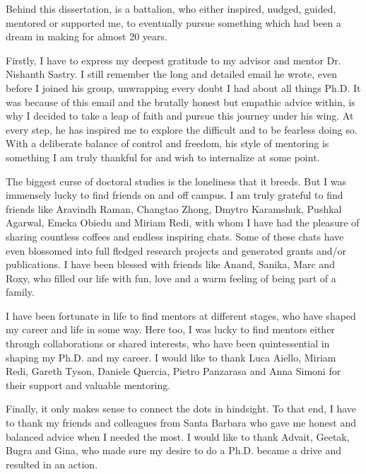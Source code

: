 
\begin{acknowledgements}      

Behind this dissertation, is a battalion, who either inspired, nudged, guided, mentored or supported me, to eventually pursue something which had been a dream in making for almost 20 years. 

Firstly, I have to express my deepest gratitude to my advisor and mentor Dr. Nishanth Sastry. I still remember the long and detailed email he wrote, even before I joined his group, unwrapping every doubt I had about all things Ph.D. It was because of this email and the brutally honest but empathic advice within, is why I decided to take a leap of faith and pursue this journey under his wing.  At every step, he has inspired me to explore the difficult and to be fearless doing so. With a deliberate balance of control and freedom, his style of mentoring is something I am truly thankful for and wish to internalize at some point.

The biggest curse of doctoral studies is the loneliness that it breeds. But I was immensely lucky to find friends on and off campus. I am truly grateful to find friends like Aravindh Raman, Changtao Zhong, Dmytro Karamshuk, Pushkal Agarwal, Emeka Obiedu and Miriam Redi, with whom I have had the pleasure of sharing countless coffees and endless inspiring chats. Some of these chats have even blossomed into full fledged research projects and generated grants and/or publications. I have been blessed with friends like Anand, Sanika, Marc and Roxy, who filled our life with fun, love and a warm feeling of being part of a family. 

I have been fortunate in life to find mentors at different stages, who have shaped my career and life in some way. Here too, I was lucky to find mentors either through collaborations or shared interests, who have been quintessential in shaping my Ph.D. and my career. I would like to thank Luca Aiello, Miriam Redi, Gareth Tyson, Daniele Quercia, Pietro Panzarasa and Anna Simoni for their support and valuable mentoring. 

Finally, it only makes sense to connect the dots in hindsight. To that end, I have to thank my friends and colleagues from Santa Barbara who gave me honest and balanced advice when I needed the most. I would like to thank Advait, Geetak, Bugra and Gina, who made sure my desire to do a Ph.D. became a drive and resulted in an action. 


\end{acknowledgements}
